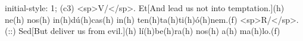 initial-style: 1;
(c3) <sp>V/</sp>. Et[And lead us not into temptation.](h) ne(h) nos(h) in(h)dú(h)cas(h) in(h) ten(h)ta(h)ti(h)ó(h)nem.(f) <sp>R/</sp>.(::) Sed[But deliver us from evil.](h) lí(h)be(h)ra(h) nos(h) a(h) ma(h)lo.(f)

